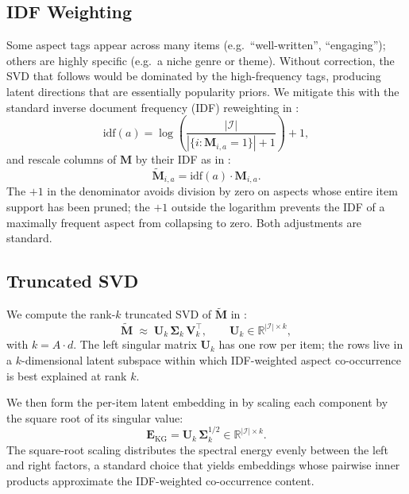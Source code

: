 \subsection{IDF Weighting}
\label{sec:kgsvd-idf}

Some aspect tags appear across many items (e.g.\ ``well-written'', ``engaging''); others are highly specific (e.g.\ a niche genre or theme). Without correction, the SVD that follows would be dominated by the high-frequency tags, producing latent directions that are essentially popularity priors. We mitigate this with the standard inverse document frequency (IDF) reweighting in :
\begin{equation}
\label{eq:idf}
\mathrm{idf}(a) = \log\!\left( \frac{|\mathcal{I}|}{|\{i : \mathbf{M}_{i,a} = 1\}| + 1} \right) + 1,
\end{equation}
and rescale columns of $\mathbf{M}$ by their IDF as in :
\begin{equation}
\label{eq:idf-rescale}
\tilde{\mathbf{M}}_{i,a} = \mathrm{idf}(a) \cdot \mathbf{M}_{i,a}.
\end{equation}
The $+1$ in the denominator avoids division by zero on aspects whose entire item support has been pruned; the $+1$ outside the logarithm prevents the IDF of a maximally frequent aspect from collapsing to zero. Both adjustments are standard.

\subsection{Truncated SVD}
\label{sec:kgsvd-svd}

We compute the rank-$k$ truncated SVD of $\tilde{\mathbf{M}}$ in :
\begin{equation}
\label{eq:svd}
\tilde{\mathbf{M}} \;\approx\; \mathbf{U}_k\, \boldsymbol{\Sigma}_k\, \mathbf{V}_k^{\top}, \qquad \mathbf{U}_k \in \mathbb{R}^{|\mathcal{I}| \times k},
\end{equation}
with $k = A \cdot d$. The left singular matrix $\mathbf{U}_k$ has one row per item; the rows live in a $k$-dimensional latent subspace within which IDF-weighted aspect co-occurrence is best explained at rank $k$.

We then form the per-item latent embedding in  by scaling each component by the square root of its singular value:
\begin{equation}
\label{eq:svd-embed}
\mathbf{E}_{\mathrm{KG}} = \mathbf{U}_k\, \boldsymbol{\Sigma}_k^{1/2} \in \mathbb{R}^{|\mathcal{I}| \times k}.
\end{equation}
The square-root scaling distributes the spectral energy evenly between the left and right factors, a standard choice that yields embeddings whose pairwise inner products approximate the IDF-weighted co-occurrence content.

